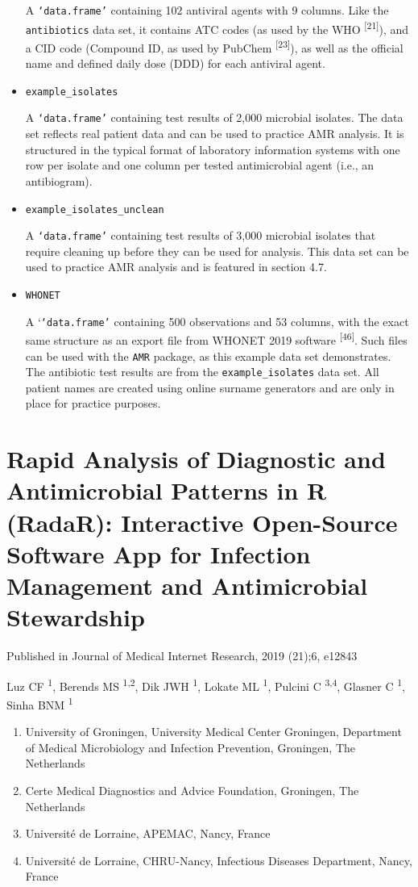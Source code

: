 \documentclass[
]{book}
\providecommand{\tightlist}{%
  \setlength{\itemsep}{0pt}\setlength{\parskip}{0pt}}
\begin{document}
\begin{itemize}
  A \texttt{‘data.frame’} containing 102 antiviral agents with 9 columns. Like the \texttt{antibiotics} data set, it contains ATC codes (as used by the WHO \textsuperscript{{[}21{]}}), and a CID code (Compound ID, as used by PubChem \textsuperscript{{[}23{]}}), as well as the official name and defined daily dose (DDD) for each antiviral agent.
\item
  \texttt{example\_isolates}

  A \texttt{‘data.frame’} containing test results of 2,000 microbial isolates. The data set reflects real patient data and can be used to practice AMR analysis. It is structured in the typical format of laboratory information systems with one row per isolate and one column per tested antimicrobial agent (i.e., an antibiogram).
\item
  \texttt{example\_isolates\_unclean}

  A \texttt{‘data.frame’} containing test results of 3,000 microbial isolates that require cleaning up before they can be used for analysis. This data set can be used to practice AMR analysis and is featured in section 4.7.
\item
  \texttt{WHONET}

  A `\texttt{‘data.frame’} containing 500 observations and 53 columns, with the exact same structure as an export file from WHONET 2019 software \textsuperscript{{[}46{]}}. Such files can be used with the \texttt{AMR} package, as this example data set demonstrates. The antibiotic test results are from the \texttt{example\_isolates} data set. All patient names are created using online surname generators and are only in place for practice purposes.
\end{itemize}

\hypertarget{ch05-radar}{%
\chapter{Rapid Analysis of Diagnostic and Antimicrobial Patterns in R (RadaR): Interactive Open-Source Software App for Infection Management and Antimicrobial Stewardship}\label{ch05-radar}}

Published in Journal of Medical Internet Research, 2019 (21);6, e12843

Luz CF \textsuperscript{1}, Berends MS \textsuperscript{1,2}, Dik JWH \textsuperscript{1}, Lokate ML \textsuperscript{1}, Pulcini C \textsuperscript{3,4}, Glasner C \textsuperscript{1}, Sinha BNM \textsuperscript{1}

\begin{enumerate}
\def\labelenumi{\arabic{enumi}.}
\tightlist
\item
  University of Groningen, University Medical Center Groningen, Department of Medical Microbiology and Infection Prevention, Groningen, The Netherlands
\item
  Certe Medical Diagnostics and Advice Foundation, Groningen, The Netherlands
\item
  Université de Lorraine, APEMAC, Nancy, France
\item
  Université de Lorraine, CHRU-Nancy, Infectious Diseases Department, Nancy, France
\end{enumerate}
\end{document}
